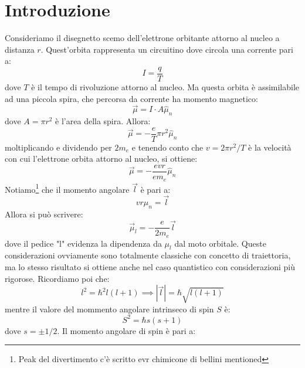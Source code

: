 \documentclass{book}
\begin{document}
    \section{Introduzione}
    Consideriamo il disegnetto scemo dell'elettrone orbitante attorno al nucleo a distanza $r$. Quest'orbita rappresenta un circuitino dove circola una corrente pari a:
    \begin{equation}
        I = \frac{q}{T}
    \end{equation}
    dove $T$ è il tempo di rivoluzione attorno al nucleo. Ma questa orbita è assimilabile ad una piccola spira, che percorsa da corrente ha momento magnetico:
    \begin{equation}
        \vec{\mu} = I \cdot A \hat{\mu}_{n}
    \end{equation}
    dove $A = \pi r^{2}$ è l'area della spira. Allora:
    \begin{equation}
        \vec{\mu} = -\frac{e}{T} \pi r^{2} \hat{\mu}_{n}
    \end{equation}
    moltiplicando e dividendo per $2m_{e}$ e tenendo conto che $v = 2\pi r^{2}/T$ è la velocità con cui l'elettrone orbita attorno al nucleo, si ottiene:
    \begin{equation}
        \vec{\mu} = -\frac{e v r}{em_{e}} \hat{\mu}_{n}
    \end{equation}
    Notiamo\footnote{Peak del divertimento c'è scritto evr chimicone di bellini mentioned} che il momento angolare $\vec{l}$ è pari a:
    \begin{equation}
        v r \hat{\mu}_{n} = \vec{l}
    \end{equation}
    Allora si può scrivere:
    \begin{equation}
        \vec{\mu}_{l} = -\frac{e}{2m_{e}} \vec{l}
    \end{equation}
    dove il pedice "l" evidenza la dipendenza da $\mu_{l}$ dal moto orbitale. Queste considerazioni ovviamente sono totalmente classiche con concetto di traiettoria, ma lo stesso risultato si ottiene anche nel caso quantistico con considerazioni più rigorose. Ricordiamo poi che:
    \begin{equation}
        l^{2} = \hbar ^{2} l(l+1) \implies |\vec{l}| = \hbar \sqrt{l(l+1)}
    \end{equation}
    mentre il valore del mommento angolare intrinseco di spin $S$ è:
    \begin{equation}
        S^{2} = \hbar s(s+1)
    \end{equation}
    dove $s = \pm 1/2$. Il momento angolare di spin è pari a:
\end{document}
